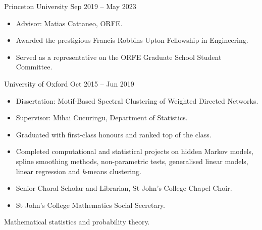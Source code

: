 \documentclass[
  date,
  number,
]{wgu-cv}
\begin{document}
\maketitle





{Princeton University}
{Sep 2019 -- May 2023}

\begin{itemize}
  \item Advisor: Matias Cattaneo, ORFE.
	\item Awarded the prestigious Francis Robbins Upton Fellowship in Engineering.
  \item Served as a representative on the ORFE Graduate School Student Committee.
\end{itemize}


{University of Oxford}
{Oct 2015 -- Jun 2019}

\begin{itemize}
  \item Dissertation:
    Motif-Based Spectral Clustering of Weighted Directed Networks.
  \item Supervisor:
    Mihai Cucuringu,
    Department of Statistics.
  \item Graduated with first-class honours and ranked top of the class.
  \item Completed computational and statistical projects on
    hidden Markov models,
    spline smoothing methods,
    non-parametric tests,
    generalised linear models,
    linear regression
    and
    \textit{k}-means clustering.
	\item Senior Choral Scholar and Librarian,
    St John's College Chapel Choir.
	\item St John's College Mathematics Social Secretary.
\end{itemize}



Mathematical statistics and probability theory.


\end{document}
